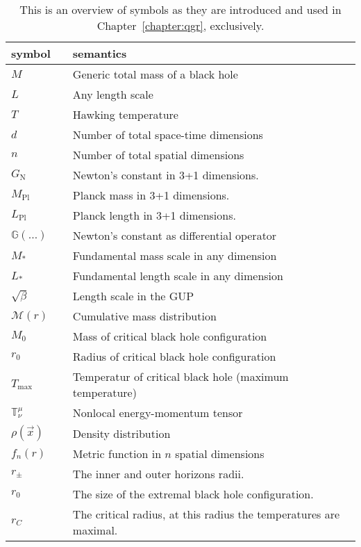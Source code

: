 \begin{table}[t]
	\begin{tabularx}{\linewidth}{llX}
	\firsthline
	symbol && semantics \\
	\hline
	$M$ & & Generic total mass of a black hole \\
	$L$ && Any length scale \\
	$T$  & & Hawking temperature \\
	$d$ & & Number of total space-time dimensions \\
	$n$ && Number of total spatial dimensions \\
	$G_\mathrm N$  & & Newton's constant in 3+1 dimensions. \\
	$M_\mathrm{Pl}$ & & Planck mass in 3+1 dimensions. \\
	$L_\mathrm{Pl}$   & & Planck length in 3+1 dimensions. \\
	$\mathbb G(\dots)$ && Newton's constant as differential operator \\
	$M_*$ && Fundamental mass scale in any dimension \\
	$L_*$ && Fundamental length scale in any dimension \\
	$\sqrt{\beta}$ && Length scale in the GUP \\
	$\mathcal M(r)$ & & Cumulative mass distribution \\
	$M_0$ & & Mass of critical black hole configuration \\
	$r_0$ && Radius of critical black hole configuration \\
	$T_\textrm{max}$ && Temperatur of critical black hole (maximum temperature) 
	\\
	$\mathbb T^\mu_\nu$ & & Nonlocal energy-momentum tensor \\
	$\rho(\vec x)$ && Density distribution  \\
	$f_n(r)$ && Metric function in $n$ spatial dimensions \\
	$r_\pm$ & & The inner and outer horizons radii. \\
	$r_0$ && The size of the extremal black hole configuration. \\
	$r_C$ && The critical radius, at this radius the temperatures are maximal. 
	\\
	\hline
	\end{tabularx}
	\caption[List of symbols used in the GUP chapter]{
		This is an overview of symbols as they are introduced and used in
		Chapter~\protect\ref{chapter:qgr}, exclusively.
    }\label{table:overview-gup-symbols}
\end{table}


